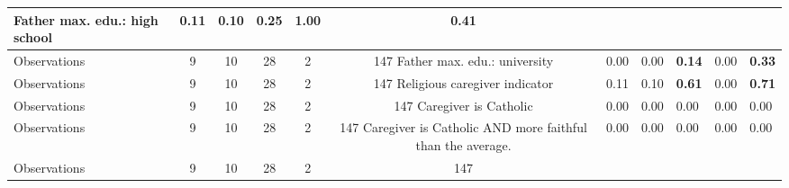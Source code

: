 \begin{tabular}{l c c c c c c }
Father max. edu.: high school &      0.11 &      0.10 &      0.25 & \textbf{     1.00} & \textbf{     0.41} \\
\midrule
Observations &         9 &        10 &        28 &         2 &       147
Father max. edu.: university &      0.00 &      0.00 & \textbf{     0.14} &      0.00 & \textbf{     0.33} \\
\midrule
Observations &         9 &        10 &        28 &         2 &       147
Religious caregiver indicator &      0.11 &      0.10 & \textbf{     0.61} &      0.00 & \textbf{     0.71} \\
\midrule
Observations &         9 &        10 &        28 &         2 &       147
Caregiver is Catholic &      0.00 &      0.00 &      0.00 &      0.00 &      0.00 \\
\midrule
Observations &         9 &        10 &        28 &         2 &       147
Caregiver is Catholic AND more faithful than the average. &      0.00 &      0.00 &      0.00 &      0.00 &      0.00 \\
\midrule
Observations &         9 &        10 &        28 &         2 &       147
\bottomrule
\end{tabular}
